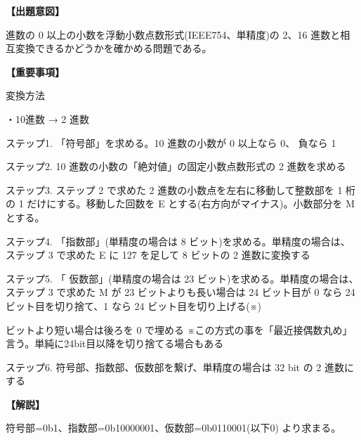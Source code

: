 \noindent \textbf{【出題意図】}

 進数の 0 以上の小数を浮動小数点数形式(IEEE754、単精度)の 2、16 進数と相互変換できるかどうかを確かめる問題である。

\vspace{1em}
\noindent \textbf{【重要事項】}

\noindent 変換方法

\medskip
\noindent ・10進数 → 2 進数

\medskip
\noindent ステップ1. 「符号部」を求める。10 進数の小数が 0 以上なら 0、 負なら 1 

\noindent ステップ2.  10 進数の小数の「絶対値」の固定小数点数形式の 2 進数を求める 

\noindent ステップ3.  ステップ 2 で求めた 2 進数の小数点を左右に移動して整数部を 1 桁の 1 だけにする。移動した回数を E とする(右方向がマイナス)。小数部分を M とする。

\noindent ステップ4.  「指数部」(単精度の場合は 8 ビット)を求める。単精度の場合は、ステップ 3 で求めた E に 127 を足して 8 ビットの 2 進数に変換する

\noindent ステップ5. 「 仮数部」(単精度の場合は 23 ビット)を求める。単精度の場合は、ステップ 3 で求めた M が 23 ビットよりも長い場合は 24 ビット目が 0 なら 24 ビット目を切り捨て、1 なら 24 ビット目を切り上げる(※)

 ビットより短い場合は後ろを 0 で埋める ※この方式の事を「最近接偶数丸め」言う。単純に24bit目以降を切り捨てる場合もある 

\noindent ステップ6.  符号部、指数部、仮数部を繋げ、単精度の場合は 32 bit の 2 進数にする


\vspace{1em}
\noindent \textbf{【解説】}

\noindent 符号部=0b1、指数部=0b10000001、仮数部=0b0110001(以下0) より求まる。
